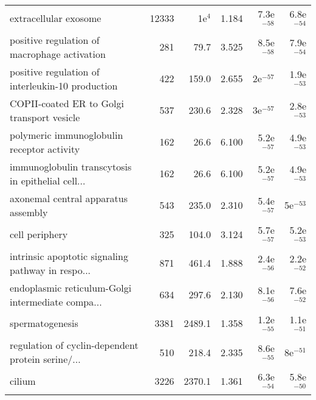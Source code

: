 \begin{longtable}{lrrrrr}
                             extracellular exosome &                   12333 &                1e$^{4}$ &      1.184 &         7.3e$^{-58}$ &         6.8e$^{-54}$ \\
      positive regulation of macrophage activation &                     281 &                    79.7 &      3.525 &         8.5e$^{-58}$ &         7.9e$^{-54}$ \\
  positive regulation of interleukin-10 production &                     422 &                   159.0 &      2.655 &           2e$^{-57}$ &         1.9e$^{-53}$ \\
        COPII-coated ER to Golgi transport vesicle &                     537 &                   230.6 &      2.328 &           3e$^{-57}$ &         2.8e$^{-53}$ \\
        polymeric immunoglobulin receptor activity &                     162 &                    26.6 &      6.100 &         5.2e$^{-57}$ &         4.9e$^{-53}$ \\
 immunoglobulin transcytosis in epithelial cell... &                     162 &                    26.6 &      6.100 &         5.2e$^{-57}$ &         4.9e$^{-53}$ \\
               axonemal central apparatus assembly &                     543 &                   235.0 &      2.310 &         5.4e$^{-57}$ &           5e$^{-53}$ \\
                                    cell periphery &                     325 &                   104.0 &      3.124 &         5.7e$^{-57}$ &         5.2e$^{-53}$ \\
 intrinsic apoptotic signaling pathway in respo... &                     871 &                   461.4 &      1.888 &         2.4e$^{-56}$ &         2.2e$^{-52}$ \\
 endoplasmic reticulum-Golgi intermediate compa... &                     634 &                   297.6 &      2.130 &         8.1e$^{-56}$ &         7.6e$^{-52}$ \\
                                   spermatogenesis &                    3381 &                  2489.1 &      1.358 &         1.2e$^{-55}$ &         1.1e$^{-51}$ \\
 regulation of cyclin-dependent protein serine/... &                     510 &                   218.4 &      2.335 &         8.6e$^{-55}$ &           8e$^{-51}$ \\
                                            cilium &                    3226 &                  2370.1 &      1.361 &         6.3e$^{-54}$ &         5.8e$^{-50}$ \\

\end{longtable}
